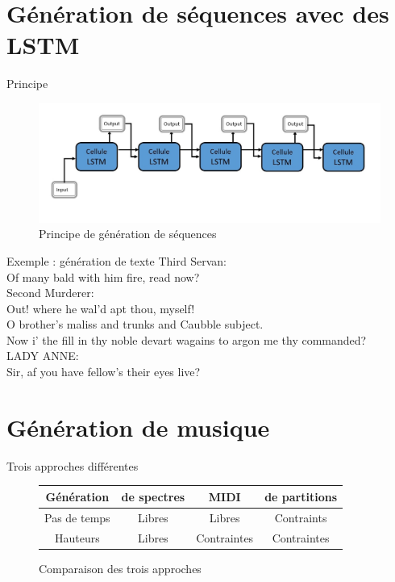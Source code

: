 \documentclass{beamer}
\begin{document}
\section{Génération de séquences avec des LSTM}

\begin{frame}{Principe}
\begin{figure}
\begin{center}
\includegraphics[scale=0.5]{images/lstm_generation.png}
\caption{Principe de génération de séquences}
\end{center}
\end{figure}
\end{frame}


\begin{frame}{Exemple : génération de texte}
Third Servan:\\
Of many bald with him fire, read now?\\
\medbreak
Second Murderer:\\
Out! where he wal’d apt thou, myself!\\
O brother’s maliss and trunks and Caubble subject.\\
Now i’ the fill in thy noble devart wagains to argon me
thy commanded?\\
\medbreak
LADY ANNE:\\
Sir, af you have fellow’s their eyes live?
\end{frame}

\section{Génération de musique}

\begin{frame}{Trois approches différentes}
\begin{figure}
\begin{center}
\begin{tabular}{|c|c|c|c|}
\hline
\textbf{Génération} & \textbf{de spectres} & \textbf{MIDI} & \textbf{de partitions} \\
\hline
Pas de temps & Libres & Libres & Contraints \\
\hline
Hauteurs & Libres & Contraintes & Contraintes \\
\hline
\end{tabular}
\caption{Comparaison des trois approches}
\end{center}
\end{figure}
\end{frame}
\end{document}
